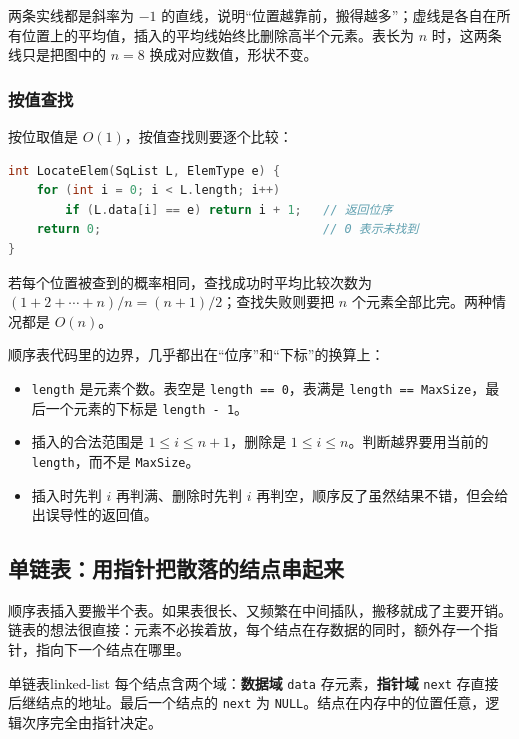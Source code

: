 两条实线都是斜率为 $-1$ 的直线，说明“位置越靠前，搬得越多”；虚线是各自在所有位置上的平均值，插入的平均线始终比删除高半个元素。表长为 $n$ 时，这两条线只是把图中的 $n=8$ 换成对应数值，形状不变。

\subsubsection{按值查找}

按位取值是 $O(1)$，按值查找则要逐个比较：

\begin{lstlisting}[language=C]
int LocateElem(SqList L, ElemType e) {
    for (int i = 0; i < L.length; i++)
        if (L.data[i] == e) return i + 1;   // 返回位序
    return 0;                               // 0 表示未找到
}
\end{lstlisting}

若每个位置被查到的概率相同，查找成功时平均比较次数为 $(1+2+\cdots+n)/n=(n+1)/2$；查找失败则要把 $n$ 个元素全部比完。两种情况都是 $O(n)$。

\begin{attention}
顺序表代码里的边界，几乎都出在“位序”和“下标”的换算上：
\begin{itemize}
\item \texttt{length} 是元素个数。表空是 \texttt{length == 0}，表满是 \texttt{length == MaxSize}，最后一个元素的下标是 \texttt{length - 1}。
\item 插入的合法范围是 $1\leqslant i\leqslant n+1$，删除是 $1\leqslant i\leqslant n$。判断越界要用当前的 \texttt{length}，而不是 \texttt{MaxSize}。
\item 插入时先判 $i$ 再判满、删除时先判 $i$ 再判空，顺序反了虽然结果不错，但会给出误导性的返回值。
\end{itemize}
\end{attention}

\subsection{单链表：用指针把散落的结点串起来}

顺序表插入要搬半个表。如果表很长、又频繁在中间插队，搬移就成了主要开销。链表的想法很直接：元素不必挨着放，每个结点在存数据的同时，额外存一个指针，指向下一个结点在哪里。

\begin{mydef}{单链表}{linked-list}
每个结点含两个域：\textbf{数据域} \texttt{data} 存元素，\textbf{指针域} \texttt{next} 存直接后继结点的地址。最后一个结点的 \texttt{next} 为 \texttt{NULL}。结点在内存中的位置任意，逻辑次序完全由指针决定。
\end{mydef}

